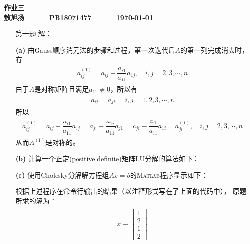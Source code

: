 \documentclass[12pt,a4paper,utf8]{ctexart}
\begin{document}


\begin{center}
   \textbf{作业三}\\
   \textbf{敖旭扬 ~~~~~ PB18071477 ~~~~~ \today}\\
\end{center}
\textit{}
\vspace{\baselineskip}

\begin{enumerate}
   \item[第一题] 解：
   \item[\textbf{(a)}]
         由Gauss顺序消元法的步骤和过程，第一次迭代后$A$的第一列完成消去时，有
         \begin{eqnarray}
            \begin{aligned}
               a_{ij}^{(1)}=a_{ij}-\dfrac{a_{i1}}{a_{11}}a_{1j},\quad i,j=2,3,\cdots,n
            \end{aligned}
         \end{eqnarray}
         由于$A$是对称矩阵且满足$a_{11} \neq 0$，所以有
         \begin{eqnarray}
            \begin{aligned}
               a_{ij}=a_{ji},\quad i,j=1,2,3,\cdots,n
            \end{aligned}
         \end{eqnarray}
         所以
         \begin{eqnarray}
            \begin{aligned}
               a_{ij}^{(1)}=a_{ij}-\dfrac{a_{i1}}{a_{11}}a_{1j}=a_{ji}-\dfrac{a_{1i}}{a_{11}}a_{j1}=a_{ji}-\dfrac{a_{j1}}{a_{11}}a_{1i}=a_{ji}^{(1)},\quad i,j=2,3,\cdots,n
            \end{aligned}
         \end{eqnarray}
         从而$A^{(1)}$是对称的。
   \item[\textbf{(b)}]
         计算一个正定(positive definite)矩阵LU分解的算法如下：
         
   \item[\textbf{(c)}]
         使用Cholesky分解解方程组$Ax = b$的\textsc{Matlab}程序显示如下：
         

         根据上述程序在命令行输出的结果（以注释形式写在了上面的代码中），
         原题所求的解为：
         \begin{eqnarray}
            \begin{aligned}
               x=\begin{bmatrix}
                  1 \\
                  2 \\
                  1 \\
                  2
               \end{bmatrix}
               \nonumber
            \end{aligned}
         \end{eqnarray}


\end{enumerate}
\end{document}
